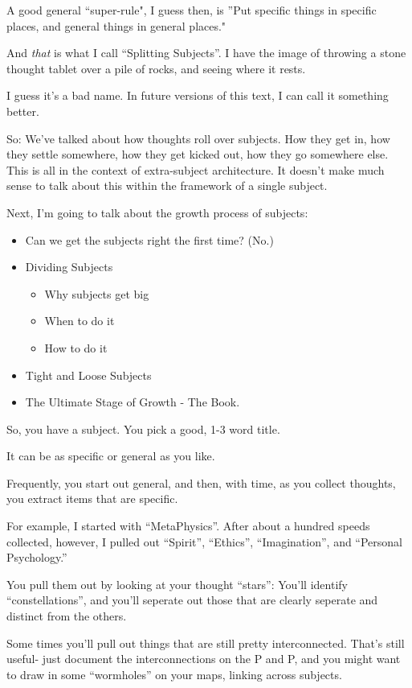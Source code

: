 \documentclass[oneside]{book}
\begin{document}
A good general ``super-rule", I guess then, is ''Put specific things in
specific places, and general things in general places."

And \emph{that} is what I call ``Splitting Subjects''. I have the image of
throwing a stone thought tablet over a pile of rocks, and seeing where
it rests.

I guess it's a bad name. In future versions of this text, I can call
it something better.

So: We've talked about how thoughts roll over subjects. How they get
in, how they settle somewhere, how they get kicked out, how they go
somewhere else. This is all in the context of extra-subject
architecture. It doesn't make much sense to talk about this within the
framework of a single subject.

Next, I'm going to talk about the growth process of subjects:

\begin{itemize}
\item Can we get the subjects right the first time? (No.)
\item Dividing Subjects
\begin{itemize}
  \item Why subjects get big
  \item When to do it
  \item How to do it
\end{itemize}
\item Tight and Loose Subjects
\item The Ultimate Stage of Growth - The Book.
\end{itemize}

So, you have a subject. You pick a good, 1-3 word title.

It can be as specific or general as you like.

Frequently, you start out general, and then, with time, as you collect
thoughts, you extract items that are specific.

For example, I started with ``MetaPhysics''. After about a hundred
speeds collected, however, I pulled out ``Spirit'', ``Ethics'',
``Imagination'', and ``Personal Psychology.''

You pull them out by looking at your thought ``stars'': You'll identify
``constellations'', and you'll seperate out those that are clearly
seperate and distinct from the others.

Some times you'll pull out things that are still pretty
interconnected. That's still useful- just document the
interconnections on the P and P, and you might want to draw in some
``wormholes'' on your maps, linking across subjects.
\end{document}
